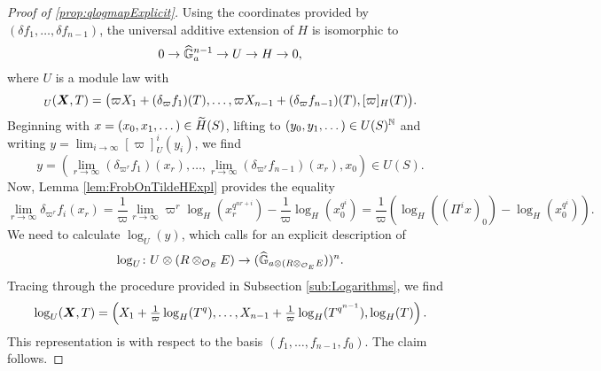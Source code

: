 \documentclass[../main.tex]{subfiles}
\begin{document}
\begin{proof}[Proof of \cref{prop:qlogmapExplicit}]
  Using the coordinates provided by $(\delta f_1, \dots, \delta f_{n-1})$, the
  universal additive extension of $H$ is isomorphic to 
  \begin{equation*}
    0 \to \Ghat_a^{n-1} \to U \to H \to 0,
  \end{equation*}
  where $U$ is a module law with 
  \begin{equation*}
    [\varpi]_U(\bX, T) = \big(\varpi X_1 + (\delta_{\varpi}f_1)(T), \dots, \varpi X_{n-1} + 
    (\delta_{\varpi}f_{n-1})(T), [\varpi]_H(T)\big).
  \end{equation*}
  Beginning with $x = (x_0, x_1, \dots) \in \Tilde H (S)$, lifting to $(y_0,
  y_1, \dots) \in U(S)^\N$ 
  and writing $y = \lim_{i\to\infty} [\varpi]_U^i (y_i)$, we find
  \begin{equation*}
    y = \left(\lim_{r\to\infty} (\delta_{\varpi^r} f_1)(x_r), \dots, \lim_{r\to \infty}
    (\delta_{\varpi^r}f_{n-1})(x_r), x_0\right) \in U(S).
  \end{equation*}
  Now, Lemma \ref{lem:FrobOnTildeHExpl} provides the equality
  $$\lim_{r\to\infty}\delta_{\varpi^r} f_i(x_r) = \frac 1\varpi \lim_{r \to \infty}
  \varpi^r \log_H(x_r^{q^{nr+i}}) - \frac 1\varpi \log_H\left(x_0^{q^i}\right) = 
  \frac 1\varpi \left(\log_H((\Pi^i x)_0)- \log_H(x_0^{q^i})\right).$$
  We need to calculate $\log_U(y)$, which calls for an explicit description of 
  $$\log_U \colon U \otimes (R \otimes_{\cO_E}E) \to (\Ghat_{a \otimes(R
  \otimes_{\cO_E} E}))^n.$$ 
  Tracing through the procedure provided in Subsection \ref{sub:Logarithms},
  we find
  \begin{equation*}
    \log_U(\bX, T) = \left(X_1 + \tfrac 1\varpi \log_H(T^q), \dots, 
    X_{n-1} + \tfrac 1\varpi \log_H(T^{q^{n-1}}), \log_H(T)\right).
  \end{equation*}
  This representation is with respect to the basis $(f_1, \dots, f_{n-1}, f_0)$. 
  The claim follows.
\end{proof}

\end{document}
